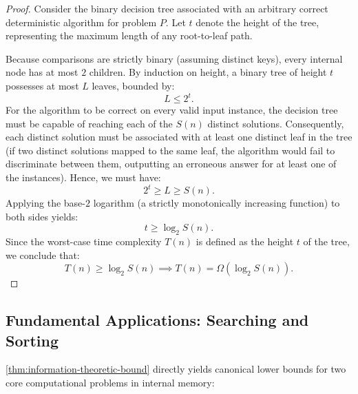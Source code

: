 \begin{proof}
Consider the binary decision tree associated with an arbitrary correct deterministic algorithm for problem $P$. Let $t$ denote the height of the tree, representing the maximum length of any root-to-leaf path.

Because comparisons are strictly binary (assuming distinct keys), every internal node has at most $2$ children. By induction on height, a binary tree of height $t$ possesses at most $L$ leaves, bounded by:
\begin{equation}
  L \le 2^t.
\end{equation}
For the algorithm to be correct on every valid input instance, the decision tree must be capable of reaching each of the $S(n)$ distinct solutions. Consequently, each distinct solution must be associated with at least one distinct leaf in the tree (if two distinct solutions mapped to the same leaf, the algorithm would fail to discriminate between them, outputting an erroneous answer for at least one of the instances). Hence, we must have:
\begin{equation}
  2^t \ge L \ge S(n).
\end{equation}
Applying the base-$2$ logarithm (a strictly monotonically increasing function) to both sides yields:
\begin{equation}
  t \ge \log_2 S(n).
\end{equation}
Since the worst-case time complexity $T(n)$ is defined as the height $t$ of the tree, we conclude that:
\begin{equation}
  T(n) \ge \log_2 S(n) \implies T(n) = \Omega(\log_2 S(n)).
\end{equation}
\end{proof}

\subsection{Fundamental Applications: Searching and Sorting}
\label{subsec:search-and-sort-applications}

\autoref{thm:information-theoretic-bound} directly yields canonical lower bounds for two core computational problems in internal memory:

